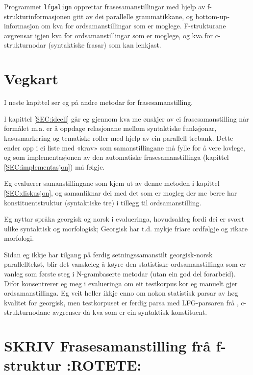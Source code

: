 \documentclass[11pt,a4paper,oneside,draft]{book}
\begin{document}
Programmet \texttt{lfgalign} opprettar frasesamanstillingar med hjelp av
f-strukturinformasjonen gitt av dei parallelle grammatikkane, og
bottom-up-informasjon om kva for ordsamanstillingar som er
moglege. F-strukturane avgrensar igjen kva for ordsamanstillingar som
er moglege, og kva for c-strukturnodar (syntaktiske frasar) som kan
lenkjast.


\section{Vegkart}
\label{sec-1.1}

I neste kapittel ser eg på andre metodar for frasesamanstilling.

I kapittel \ref{SEC:ideell} går eg gjennom kva me ønskjer av ei
frasesamanstilling når formålet m.a. er å oppdage relasjonane mellom
syntaktiske funksjonar, kasusmarkering og tematiske roller med hjelp
av ein parallell trebank. Dette ender opp i ei liste med «krav» som
samanstillingane må fylle for å vere lovlege, og som implementasjonen
av den automatiske frasesamanstillinga (kapittel
\ref{SEC:implementasjon}) må følgje.

Eg evaluerer samanstillingane som kjem ut av denne metoden i kapittel
\ref{SEC:diskusjon}, og samanliknar dei med det som er mogleg der me
berre har konstituentstruktur (syntaktiske tre) i tillegg til
ordsamanstilling.

Eg nyttar språka georgisk og norsk i evalueringa, hovudsakleg fordi
dei er svært ulike syntaktisk og morfologisk; Georgisk har t.d. mykje
friare ordfølgje og rikare morfologi.

Sidan eg ikkje har tilgang på ferdig setningssamanstilt georgisk-norsk
parallelltekst, blir det vanskeleg å køyre den statistiske
ordsamanstillinga som er vanleg som første steg i N-grambaserte
metodar (utan ein god del forarbeid). Difor konsentrerer eg meg i
evalueringa om eit testkorpus kor eg manuelt gjer
ordsamanstillinga. Eg veit heller ikkje enno om nokon statistisk
parsar av høg kvalitet for georgisk, men testkorpuset er ferdig parsa
med LFG-parsaren frå \citet{meurer2008cgg}, c-strukturnodane avgrenser
då kva som er ein syntaktisk konstituent.


\section{\textbf{SKRIV} Frasesamanstilling frå f-struktur \textbf{:ROTETE:}}
\label{sec-1.2}
\end{document}
